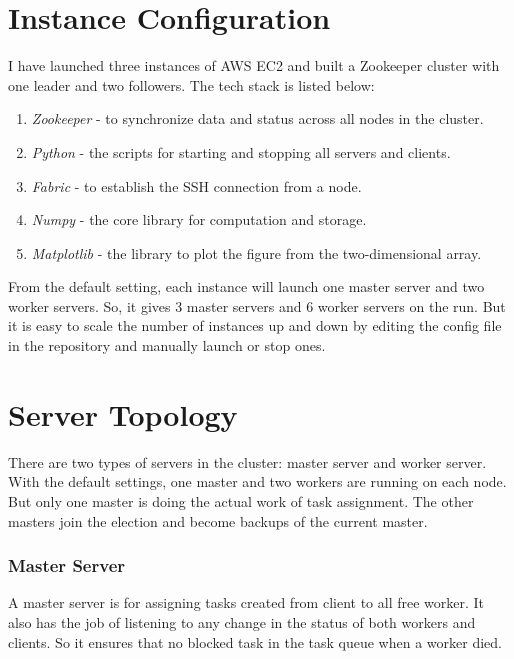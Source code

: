 \documentclass[runningheads,a4paper]{llncs}
\begin{document}
\section{Instance Configuration}

I have launched three instances of AWS EC2\cite{ec2} and built a Zookeeper\cite{zookeeper} cluster with one leader and two followers. The tech stack is listed below:



\begin{enumerate}
\item \emph{Zookeeper} - to synchronize data and status across all nodes in the cluster. 
\item \emph{Python} - the scripts for starting and stopping all servers and clients.
\item \emph{Fabric} - to establish the SSH connection from a node.
\item \emph{Numpy} - the core library for computation and storage.
\item \emph{Matplotlib} - the library to plot the figure from the two-dimensional array.
\end{enumerate}



From the default setting, each instance will launch one master server and two worker servers. So, it gives 3 master servers and 6 worker servers on the run. But it is easy to scale the number of instances up and down by editing the config file in the repository and manually launch or stop ones.


\section{Server Topology}

There are two types of servers in the cluster: master server and worker server. With the default settings, one master and two workers are running on each node. But only one master is doing the actual work of task assignment. The other masters join the election and become backups of the current master. 

\subsubsection{Master Server}

A master server is for assigning tasks created from client to all free worker. It also has the job of listening to any change in the status of both workers and clients. So it ensures that no blocked task in the task queue when a worker died. 
\end{document}
